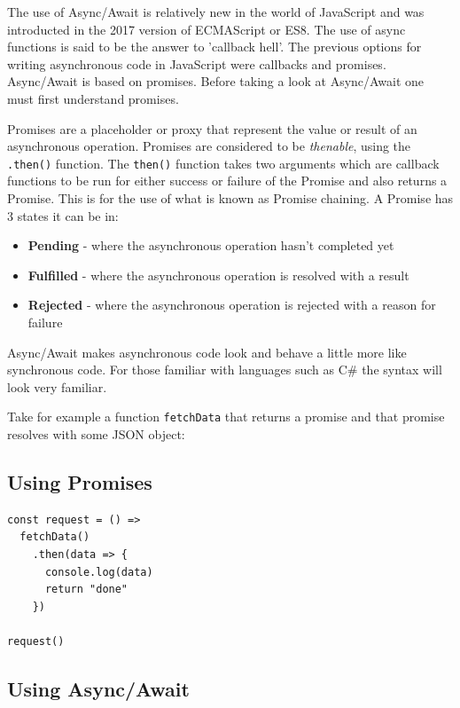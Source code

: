 The use of Async/Await is relatively new in the world of JavaScript and was introducted in the 2017 version of ECMAScript or ES8\cite{es8}. The use of async functions is said to be the answer to 'callback hell'. The previous options for writing asynchronous code in JavaScript were callbacks and promises. Async/Await is based on promises. Before taking a look at Async/Await one must first understand promises.

Promises are a placeholder or proxy that represent the value or result of an asynchronous operation. Promises are considered to be \textit{thenable}, using the \texttt{.then()} function. The \texttt{then()} function takes two arguments which are callback functions to be run for either success or failure of the Promise and also returns a Promise. This is for the use of what is known as Promise chaining. A Promise has 3 states it can be in:

\begin{itemize}
\item{\textbf{Pending} - where the asynchronous operation hasn't completed yet}
\item{\textbf{Fulfilled} - where the asynchronous operation is resolved with a result}
\item{\textbf{Rejected} - where the asynchronous operation is rejected with a reason for failure}
\end{itemize}

Async/Await makes asynchronous code look and behave a little more like synchronous code\cite{asyncawait}. For those familiar with languages such as C\# the syntax will look very familiar.

Take for example a function \texttt{fetchData} that returns a promise and that promise resolves with some JSON object:
\newpage
\subsection*{Using Promises}

\begin{verbatim}
const request = () =>
  fetchData()
    .then(data => {
      console.log(data)
      return "done"
    })

request()
\end{verbatim}

\subsection*{Using Async/Await}


